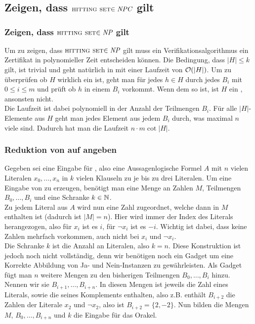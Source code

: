 \documentclass[a4paper]{article}
\begin{document}
	\section{}
		\subsection{Zeigen, dass $\hitset\in\npc$ gilt}
			\subsubsection{Zeigen, dass $\hitset\in\np$ gilt}
			Um zu zeigen, dass $\hitset\in\np$ gilt muss ein Verifikationsalgorithmus ein Zertifikat in polynomieller Zeit entscheiden können.\n
			Die Bedingung, dass $|H|\leq k$ gilt, ist trivial und geht natürlich in mit einer Laufzeit von $\mathcal{O}(|H|)$.\n
			Um zu überprüfen ob $H$ wirklich ein \hitset ist, geht man für jedes $h\in H$ durch jedes $B_i$ mit $0\leq i \leq m$ und prüft ob $h$ in einem $B_i$ vorkommt. Wenn dem so ist, ist $H$ ein \hitset, ansonsten nicht.\\
			Die Laufzeit ist dabei polynomiell in der Anzahl der Teilmengen $B_i$. Für alle $|H|$-Elemente aus $H$ geht man jedes Element aus jedem $B_i$ durch, was maximal $n$ viele sind. Dadurch hat man die Laufzeit $n\cdot m\cot |H|$.
			\subsubsection{Reduktion von \threesat auf \hitset angeben}
			Gegeben sei eine Eingabe für \sat, also eine Aussagenlogische Formel $A$ mit $n$ vielen Literalen $x_0,\dots,x_n$ in $k$ vielen Klauseln zu je bis zu drei Literalen.\n
			Um eine Eingabe von \hitset zu erzeugen, benötigt man eine Menge an Zahlen $M$, Teilmengen $B_0,\dots,B_i$ und eine Schranke $k\in\mathbb{N}$.\\
			Zu jedem Literal aus $A$ wird nun eine Zahl zugeordnet, welche dann in $M$ enthalten ist (dadurch ist $|M|=n$). Hier wird immer der Index des Literals herangezogen, also für $x_i$ ist es $i$, für $\neg x_i$ ist es $-i$. Wichtig ist dabei, dass keine Zahlen mehrfach vorkommen, auch nicht bei $x_i$ und $\neg x_i$.\\
			Die Schranke $k$ ist die Anzahl an Literalen, also $k=n$. Diese Konstruktion ist jedoch noch nicht vollständig, denn wir benötigen noch ein Gadget um eine Korrekte Abbildung von Ja- und Nein-Instanzen zu gewährleisten.\n
			Als Gadget fügt man $n$ weitere Mengen zu den bisherigen Teilmengen $B_0,\dots,B_i$ hinzu. Nennen wir sie $B_{i+1},\dots,B_{i+n}$. In diesen Mengen ist jeweils die Zahl eines Literals, sowie die seines Komplements enthalten, also z.B. enthält $B_{i+2}$ die Zahlen der Literale $x_2$ und $\neg x_2$, also ist $B_{i+2}=\{2, -2\}$.\n
			Nun bilden die Mengen $M$, $B_0,\dots,B_{i+n}$ und $k$ die Eingabe für das \hitset Orakel.
\end{document}
